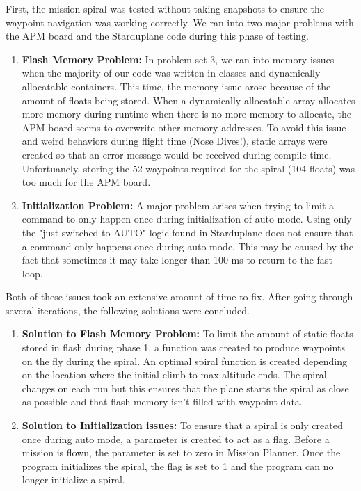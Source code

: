 \documentclass[11pt]{article}
\begin{document}
First, the mission spiral was tested without taking snapshots to ensure the waypoint navigation was working correctly. We ran into two major problems with the APM board and the Starduplane code during this phase of testing.
\begin{enumerate}
\item \textbf{Flash Memory Problem:} In problem set 3, we ran into memory issues when the majority of our code was written in classes and dynamically allocatable containers. This time, the memory issue arose because of the amount of floats being stored. When a dynamically allocatable array allocates more memory during runtime when there is no more memory to allocate, the APM board seems to overwrite other memory addresses. To avoid this issue and weird behaviors during flight time (Nose Dives!), static arrays were created so that an error message would be received during compile time. Unfortuanely, storing the 52 waypoints required for the spiral (104 floats) was too much for the APM board.
\item \textbf{Initialization Problem:} A major problem arises when trying to limit a command to only happen once during initialization of auto mode. Using only the "just switched to AUTO" logic found in Starduplane does not ensure that a command only happens once during auto mode. This may be caused by the fact that sometimes it may take longer than 100 ms to return to the fast loop.
\end{enumerate}

Both of these issues took an extensive amount of time to fix. After going through several iterations, the following solutions were concluded.
\begin{enumerate}
\item \textbf{Solution to Flash Memory Problem:} To limit the amount of static floats stored in flash during phase 1, a function was created to produce waypoints on the fly during the spiral. An optimal spiral function is created depending on the location where the initial climb to max altitude ends. The spiral changes on each run but this ensures that the plane starts the spiral as close as possible and that flash memory isn't filled with waypoint data.
\item \textbf{Solution to Initialization issues:} To ensure that a spiral is only created once during auto mode, a parameter is created to act as a flag. Before a mission is flown, the parameter is set to zero in Mission Planner. Once the program initializes the spiral, the flag is set to 1 and the program can no longer initialize a spiral.
\end{enumerate}
\end{document}
